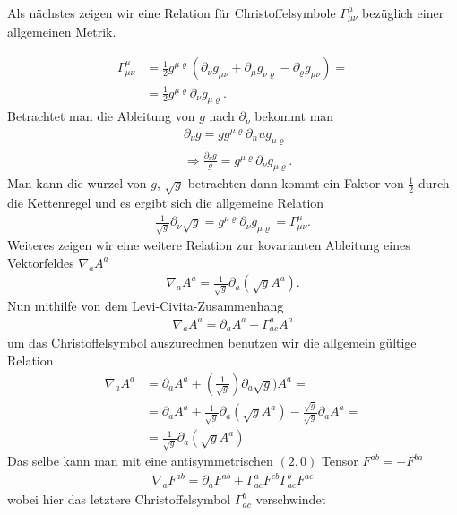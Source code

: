 \documentclass[a4paper]{article}
\begin{document}
Als nächstes zeigen wir eine Relation für Christoffelsymbole $\Gamma
^{\mu}_{\mu\nu}$ bezüglich einer allgemeinen Metrik.

\begin{align}
    \Gamma^{\mu}_{\mu\nu} &= \frac{1}{2} g^{\mu\varrho}(\partial _\nu
    g_{\mu\nu} +\partial_\mu g_{\nu\varrho} - \partial _\varrho
    g_{\mu\nu})=\\
    &= \frac{1}{2} g^{\mu\varrho} \partial_\nu g_{\mu\varrho}.
\end{align}
Betrachtet man die Ableitung von $g$ nach $\partial _\nu$ bekommt man
\begin{align}
    &\partial _\nu g = g g^{\mu\varrho} \partial_nu g_{\mu\varrho} \\
    &\Rightarrow \frac{\partial _\nu g}{g} = g^{\mu\varrho}\partial_\nu
    g_{\mu\varrho}.
\end{align}
Man kann die wurzel von $g$, $\sqrt{g}$ betrachten dann kommt ein Faktor von
$\frac{1}{2}$ durch die Kettenregel und es ergibt sich die allgemeine
Relation
\begin{align}
    \frac{1}{\sqrt{g}} \partial_\nu \sqrt{g} = g^{\mu\varrho}
    \partial _\nu g_{\mu\varrho} = \Gamma ^{\mu}_{\mu\nu}.
\end{align}
Weiteres zeigen wir eine weitere Relation zur kovarianten Ableitung eines
Vektorfeldes $\nabla_a A^a$
\begin{align}
\nabla_a A^a = \frac{1}{\sqrt{g}} \partial_a (\sqrt{g} A^a).
\end{align}
Nun mithilfe von dem Levi-Civita-Zusammenhang
\begin{align}
    \nabla _a A^a = \partial _a A^a + \Gamma^a_{ac} A^a
\end{align}
um das Christoffelsymbol auszurechnen benutzen wir die allgemein gültige
Relation
\begin{align}
    \nabla _a A^a &= \partial _a A^a + (\frac{1}{\sqrt{g}}) \partial _a
    \sqrt{g}) A^a = \\
    &= \partial _a A^a + \frac{1}{\sqrt{g}}\partial_a(\sqrt{g} A^a) -
    \frac{\sqrt{g}}{\sqrt{g}} \partial _a A^a = \\
    &= \frac{1}{\sqrt{g}} \partial _a ( \sqrt{g} A^a)
\end{align}
Das selbe kann man mit eine antisymmetrischen $(2, 0)$ Tensor $F^{ab} = -
F^{ba}$
\begin{align}
    \nabla _{a} F^{ab} = \partial_a F^{ab} + \Gamma^{a}_{ac} F^{cb}
    \Gamma^{b}_{ac} F^{ac}
\end{align}
wobei hier das letztere Christoffelsymbol $\Gamma^{b}_{ac}$ verschwindet
\end{document}
